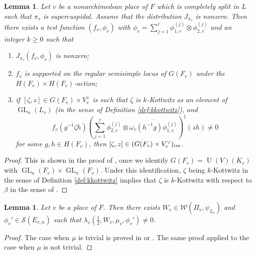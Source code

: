 \documentclass[11pt, reqno]{amsart}
\numberwithin{equation}{subsection}
\theoremstyle{plain}
\newtheorem{lem}[proposition]{Lemma}
\theoremstyle{definition}
\newcommand{\ol}{\overline}
\newcommand{\cS}{\mathcal S}
\newcommand{\W}{\mathcal W}
\DeclareMathOperator{\GL}{GL}
\DeclareMathOperator{\U}{U}
\newcommand{\rss}{\textnormal{rss}}
\begin{document}
\begin{lem}
\label{lem:rsssupp}
Let $v$ be a nonarchimedean place of $F$ which
is completely split in $L$ such that $\pi_v$
is supercuspidal. 
Assume that the distribution $J_{\pi_v}$ is
nonzero. 
Then there exists a test function $(f_v, \phi_v)$ 
with $\phi_v = \sum_{j=1}^r \phi_{1,v}^{(j)}
    \otimes \phi_{2,v}^{(j)}$
and an integer $k \ge 0$ such that 
\begin{enumerate}[(1)]
\item $J_{\pi_v}(f_v, \phi_v)$ is nonzero;
\item $f_v$ is supported on the regular
semisimple locus of $G(F_v)$ under the
$H(F_v) \times H(F_v)$-action;
\item if $[\zeta, z] \in G(F_v) \times V_v^\vee$ is 
such that $\zeta$ is $k$-Kottwitz as an
element of $\GL_n(L_v)$ (in the sense of Definition 
\ref{def:kkottwitz}), and 
\[
    f_v(g^{-1}\zeta h)\left(\sum_{j=1}^r
    \phi_{2,v}^{(j)} \otimes \ol{\omega_v(h^{-1} g)\phi_{1,v}^{(j)}}\right)^\ddagger(zh) \neq 0
\] 
for some $g, h \in H(F_v)$, then $[\zeta, z] \in 
(G(F_v) \times V_v^\vee)_\rss$.
\end{enumerate}
\end{lem}
\begin{proof}
This is shown in the proof of
{\cite[Lemma~6.13]{TGGP-Wang}}, once we identify
$G(F_v) = \U(V)(K_v)$ with $\GL_n(F_v) \times \GL_n(F_v)$.
Under this identification,
$\zeta$ being $k$-Kottwitz in the sense of Definition
\ref{def:kkottwitz} implies that $\zeta$ is
$k$-Kottwitz with respect to $\beta$
in the sense of \cite[Definition~4.10(2)]{TGGP-Wang}.
\end{proof}

\begin{lem}
\label{lem:archgood}
    Let $v$ be a place of $F$. 
    Then there exists $W_v \in \W(\Pi_v, \psi_{L_v})$ and $\phi_v' \in \cS(E_{v,n})$    such that 
    $\lambda_v(\frac12, W_v, \mu_v, \phi_v') \neq 0$.
\end{lem}
\begin{proof}
The case when $\mu$ is trivial is proved in \cite[Lemma 3.3.3]{BP21} or \cite{Yadav2025}. The same proof applied to the case when $\mu$ is not trivial. 
\end{proof}
\end{document}
